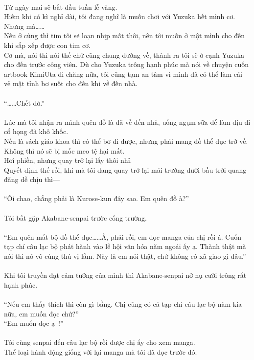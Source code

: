 \documentclass[12pt,a4paper, twosides]{book}
\begin{document}
\\
Từ ngày mai sẽ bắt đầu tuần lễ vàng.\\
Hiếm khi có kì nghỉ dài, tôi đang nghĩ là muốn chơi với Yuzuka hết mình cơ.\\
Nhưng mà……\\
Nếu ở cùng thì tim tôi sẽ loạn nhịp mất thôi, nên tôi muốn ở một mình cho đến khi sắp xếp được con tim cơ.\\
Cơ mà, nói thì nói thế chứ cũng chung đường về, thành ra tôi sẽ ở cạnh Yuzuka cho đến trước công viên. Dù cho Yuzuka trông hạnh phúc mà nói về chuyện cuốn artbook KimiUta đi chăng nữa, tôi cũng tạm an tâm vì mình đã có thể làm cái vẻ mặt tỉnh bơ suốt cho đến khi về đến nhà.\\
\\
“……Chết dở.”\\
\\
Lúc mà tôi nhận ra mình quên đồ là đã về đến nhà, uống ngụm sữa để làm dịu đi cổ họng đã khô khốc.\\
Nếu là sách giáo khoa thì có thể bơ đi được, nhưng phải mang đồ thể dục trở về. Không thì nó sẽ bị mốc meo tệ hại mất.\\
Hơi phiền, nhưng quay trở lại lấy thôi nhỉ.\\
Quyết định thế rồi, khi mà tôi đang quay trở lại mái trường dưới bầu trời quang đãng dễ chịu thì—\\
\\
“Ôi chao, chẳng phải là Kurose-kun đây sao. Em quên đồ à?”\\
\\
Tôi bắt gặp Akabane-senpai trước cổng trường.\\
\\
“Em quên mất bộ đồ thể dục……À, phải rồi, em đọc manga của chị rồi á. Cuốn tạp chí câu lạc bộ phát hành vào lễ hội văn hóa năm ngoái ấy ạ. Thành thật mà nói thì nó vô cùng thú vị lắm. Này là em nói thật, chứ không có xã giao gì đâu.”\\
\\
Khi tôi truyền đạt cảm tưởng của mình thì Akabane-senpai nở nụ cười trông rất hạnh phúc.\\
\\
“Nếu em thấy thích thì còn gì bằng. Chị cũng có cả tạp chí câu lạc bộ năm kia nữa, em muốn đọc chứ?”\\
“Em muốn đọc ạ~!”\\
\\
Tôi cùng senpai đến câu lạc bộ rồi được chị ấy cho xem manga.\\
Thể loại hành động giống với lại manga mà tôi đã đọc trước đó.\\
\end{document}
